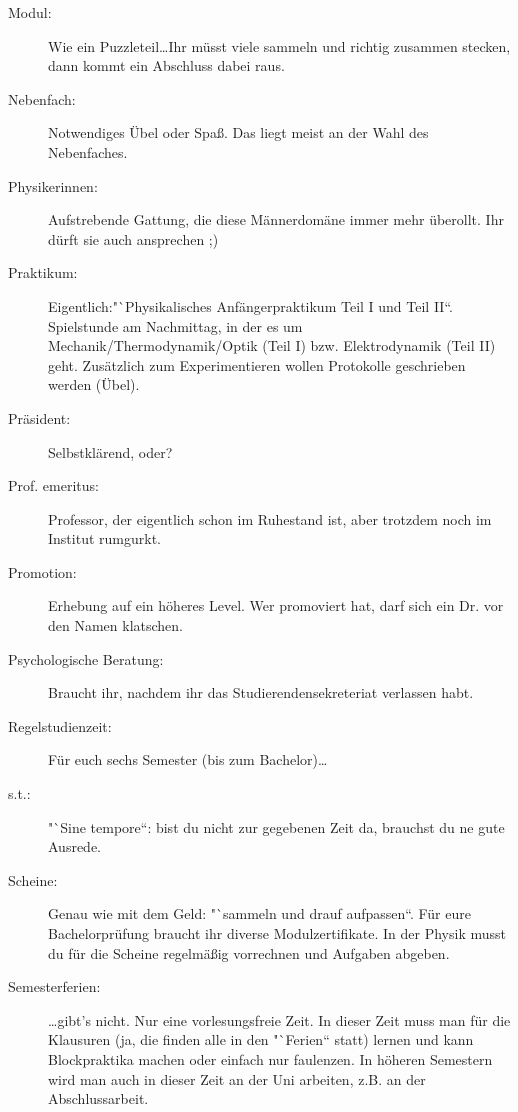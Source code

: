 \begin{description}
\item[Modul:]
Wie ein Puzzleteil\ldots Ihr müsst viele sammeln und richtig zusammen stecken, dann
kommt ein Abschluss dabei raus.

    \item[Nebenfach:]Notwendiges Übel oder Spaß.
    Das liegt meist an der Wahl des Nebenfaches.

    \item[Physikerinnen:]Aufstrebende Gattung, die diese Männerdomäne immer mehr überollt.
    Ihr dürft sie auch ansprechen ;)

    \item[Praktikum:] Eigentlich:"`Physikalisches Anfängerpraktikum Teil I und Teil II``.
Spielstunde am Nachmittag, in der es um Mechanik/Thermodynamik/Optik (Teil I) bzw.
Elektrodynamik (Teil II) geht. Zusätzlich zum Experimentieren
wollen Protokolle geschrieben werden (Übel).

    \item[Präsident:]Selbstklärend, oder?

    \item[Prof. emeritus:]Professor, der eigentlich schon
im Ruhestand ist, aber trotzdem noch im Institut rumgurkt.

    \item[Promotion:] Erhebung auf ein höheres Level.
    Wer promoviert hat, darf sich ein Dr. vor den Namen klatschen.

\item[Psychologische Beratung:] Braucht ihr, nachdem ihr das Studierendensekreteriat verlassen habt.

    \item[Regelstudienzeit:]Für euch sechs Semester (bis zum Bachelor)\ldots

    \item[s.t.:]"`Sine tempore``: bist du
nicht zur gegebenen Zeit da, brauchst du ne gute Ausrede.

    \item[Scheine:]Genau wie mit dem Geld: "`sammeln und drauf aufpassen``.
    Für eure Bachelorprüfung braucht ihr diverse Modulzertifikate.
In der Physik musst du für die Scheine regelmäßig vorrechnen und Aufgaben
abgeben.

    \item[Semesterferien:]\ldots gibt's nicht.
    Nur eine vorlesungsfreie Zeit.
In dieser Zeit muss man für die Klausuren (ja, die finden alle in den "`Ferien`` statt)
lernen und kann Blockpraktika machen oder einfach nur faulenzen. In höheren Semestern
wird man auch in dieser Zeit an der Uni arbeiten, z.B. an der
Abschlussarbeit.


\end{description}
